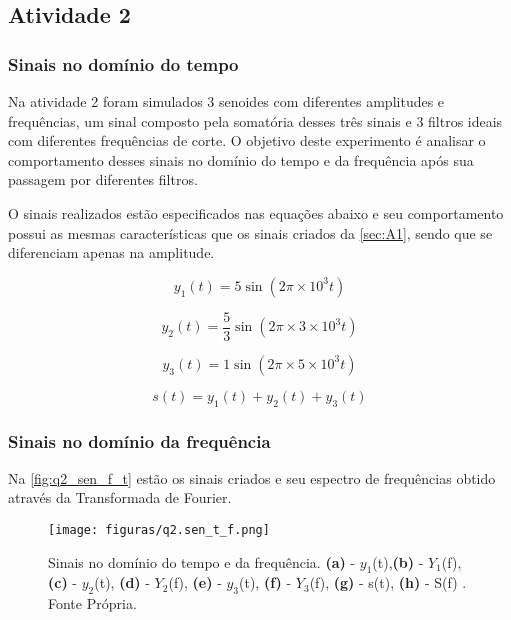 \documentclass[11pt]{classes/ifscarticle}
\begin{document}
\newpage
\subsection{Atividade 2}
\label{sec:A2}

\subsubsection{Sinais no domínio do tempo}

Na atividade 2 foram simulados 3 senoides com diferentes amplitudes e frequências, um sinal composto pela somatória desses três sinais e 3 filtros ideais com diferentes frequências de corte. O objetivo deste experimento é analisar o comportamento desses sinais no domínio do tempo e da frequência após sua passagem por diferentes filtros.

O sinais realizados estão especificados nas equações abaixo e seu comportamento possui as mesmas características que os sinais criados da \autoref{sec:A1}, sendo que se diferenciam apenas na amplitude.

 \begin{equation}
     y_1(t) = 5 \sin (2\pi\times10^3t)
     \label{eq:q2_y1}
 \end{equation}

 \begin{equation}
     y_2(t) = \frac{5}{3} \sin (2\pi\times3\times10^3t)
     \label{eq:q2_y2}
 \end{equation}
 
  \begin{equation}
     y_3(t) = 1 \sin (2\pi\times5\times10^3t)
     \label{eq:q2_y3}
 \end{equation}
 
  \begin{equation}
     s(t) = y_1(t) + y_2(t) + y_3(t)
     \label{eq:q2_s_t}
 \end{equation}

\subsubsection{Sinais no domínio da frequência}
Na \autoref{fig:q2_sen_f_t} estão os sinais criados e seu espectro de frequências obtido através da Transformada de Fourier.

\begin{figure}[ht]
    \centering
    \texttt{[image: figuras/q2.sen\_t\_f.png]}
    \caption{Sinais no domínio do tempo e da frequência. \textbf{(a)} - $y_1$(t),\textbf{(b)} - $Y_1$(f), \textbf{(c)}  - $y_2$(t), \textbf{(d)}  - $Y_2$(f), \textbf{(e)}  - $y_3$(t),  \textbf{(f)}  - $Y_3$(f), \textbf{(g)} - s(t), \textbf{(h)} - S(f) . Fonte Própria.}
    \label{fig:q2_sen_f_t}
\end{figure}
\end{document}
